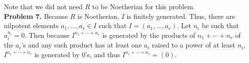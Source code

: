 \documentclass[11pt]{article}
\newcommand{\num}[1]{\noindent \textbf{#1}}
\theoremstyle{definition}
\begin{document}
\noindent Note that we did not need $R$ to be Noetherian for this problem.\\

\num{Problem 7.} Because $R$ is Noetherian, $I$ is finitely generated. Thus, there are nilpotent elements $a_1,\ldots,a_r\in I$ such that $I=(a_1,\ldots,a_r)$. Let $n_i$ be such that $a_i^{n_i}=0$. Then because $I^{n_1+\cdots+n_r}$ is generated by the products of $n_1+\cdots+n_r$ of the $a_i$'s and any such product has at least one $a_i$ raised to a power of at least $n_i$, $I^{n_1+\cdots+n_r}$ is generated by 0's, and thus $I^{n_1+\cdots+n_r}=(0)$.
\end{document}
